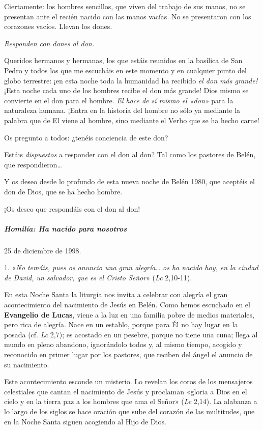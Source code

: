 \documentclass[]{article}
\let\oldsubparagraph\subparagraph
\renewcommand{\subparagraph}[1]{\oldsubparagraph{#1}\mbox{}}
\begin{document}
Ciertamente: los hombres sencillos, que viven del trabajo de sus manos,
no se presentan ante el recién nacido con las manos vacías. No se
presentaron con los corazones vacíos. Llevan los dones.

\emph{Responden con dones al don.}

Queridos hermanos y hermanas, los que estáis reunidos en la basílica de
San Pedro y todos los que me escucháis en este momento y en cualquier
punto del globo terrestre: ¡en esta noche toda la humanidad ha recibido
\emph{el don más grande!} ¡Esta noche cada uno de los hombres recibe el
don más grande! Dios mismo se convierte en el don para el hombre.
\emph{El hace de sí mismo el «don»} para la naturaleza humana. ¡Entra en
la historia del hombre no sólo ya mediante la palabra que de El viene al
hombre, sino mediante el Verbo que se ha hecho carne!

Os pregunto a todos: ¿tenéis conciencia de este don?

Estáis \emph{dispuestos} a responder con el don al don? Tal como los
pastores de Belén, que respondieron\ldots{}

Y os deseo desde lo profundo de esta nueva noche de Belén 1980, que
aceptéis el don de Dios, que se ha hecho hombre.

¡Os deseo que respondáis con el don al don!

\subparagraph{Homilía: Ha nacido para
nosotros}\label{homiluxeda-ha-nacido-para-nosotros}

25 de diciembre de 1998.

1. «\emph{No temáis, pues os anuncio una gran alegría\ldots{} os ha
nacido hoy, en la ciudad de David, un salvador, que es el Cristo Señor}»
(\emph{Lc} 2,10-11).

En esta Noche Santa la liturgia nos invita a celebrar con alegría el
gran acontecimiento del nacimiento de Jesús en Belén. Como hemos
escuchado en el \textbf{Evangelio de Lucas}, viene a la luz en una
familia pobre de medios materiales, pero rica de alegría. Nace en un
establo, porque para Él no hay lugar en la posada (cf. \emph{Lc} 2,7);
es acostado en un pesebre, porque no tiene una cuna; llega al mundo en
pleno abandono, ignorándolo todos y, al mismo tiempo, acogido y
reconocido en primer lugar por los pastores, que reciben del ángel el
anuncio de su nacimiento.

Este acontecimiento esconde un misterio. Lo revelan los coros de los
mensajeros celestiales que cantan el nacimiento de Jesús y proclaman
«gloria a Dios en el cielo y en la tierra paz a los hombres que ama el
Señor» (\emph{Lc} 2,14). La alabanza a lo largo de los siglos se hace
oración que sube del corazón de las multitudes, que en la Noche Santa
siguen acogiendo al Hijo de Dios.
\end{document}
